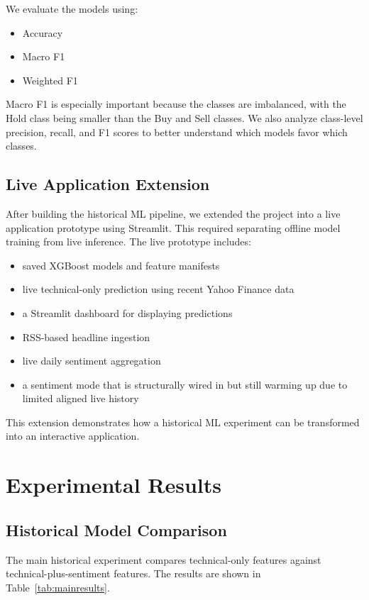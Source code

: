 \documentclass[11pt]{article}
\begin{document}
We evaluate the models using:
\begin{itemize}
    \item Accuracy
    \item Macro F1
    \item Weighted F1
\end{itemize}

Macro F1 is especially important because the classes are imbalanced, with the Hold class being smaller than the Buy and Sell classes. We also analyze class-level precision, recall, and F1 scores to better understand which models favor which classes.

\subsection{Live Application Extension}

After building the historical ML pipeline, we extended the project into a live application prototype using Streamlit. This required separating offline model training from live inference. The live prototype includes:
\begin{itemize}
    \item saved XGBoost models and feature manifests
    \item live technical-only prediction using recent Yahoo Finance data
    \item a Streamlit dashboard for displaying predictions
    \item RSS-based headline ingestion
    \item live daily sentiment aggregation
    \item a sentiment mode that is structurally wired in but still warming up due to limited aligned live history
\end{itemize}

This extension demonstrates how a historical ML experiment can be transformed into an interactive application.

\section{Experimental Results}

\subsection{Historical Model Comparison}

The main historical experiment compares technical-only features against technical-plus-sentiment features. The results are shown in Table~\ref{tab:mainresults}.
\end{document}
